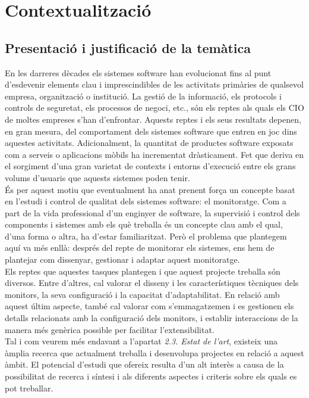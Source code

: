 \chapter{Contextualització}

\label{Contextualitzacio}

\section{Presentació i justificació de la temàtica}

En les darreres dècades els sistemes software han evolucionat fins al punt d’esdevenir elements clau i imprescindibles de les activitats primàries de qualsevol empresa, organització o institució. La gestió de la informació, els protocols i controls de seguretat, els processos de negoci, etc., són els reptes als quals els CIO de moltes empreses s’han d’enfrontar. Aquests reptes i els seus resultats depenen, en gran mesura, del comportament dels sistemes software que entren en joc dins aquestes activitats. Adicionalment, la quantitat de productes software exposats com a serveis o aplicacions mòbils ha incrementat dràsticament. Fet que deriva en el sorgiment d'una gran varietat de contexts i entorns d'execució entre els grans volums d'usuaris que aquests sistemes poden tenir. \\

És per aquest motiu que eventualment ha anat prenent força un concepte basat en l’estudi i control de qualitat dels sistemes software: el monitoratge. Com a part de la vida professional d’un enginyer de software, la supervisió i control dels components i sistemes amb els què treballa és un concepte clau amb el qual, d’una forma o altra, ha d’estar familiaritzat. Però el problema que plantegem aquí va més enllà: després del repte de monitorar els sistemes, ens hem de plantejar com dissenyar, gestionar i adaptar aquest monitoratge.\\

Els reptes que aquestes tasques plantegen i que aquest projecte treballa són diversos. Entre d'altres, cal valorar el disseny i les característiques tècniques dels monitors, la seva configuració i la capacitat d'adaptabilitat. En relació amb aquest últim aspecte, també cal valorar com s'emmagatzemen i es gestionen els detalls relacionats amb la configuració dels monitors, i establir interaccions de la manera més genèrica possible per facilitar l'extensibilitat.\\

Tal i com veurem més endavant a l’apartat \textit{2.3. Estat de l’art}, existeix una àmplia recerca que actualment treballa i desenvolupa projectes en relació a aquest àmbit. El potencial d’estudi que ofereix resulta d’un alt interès a causa de la possibilitat de recerca i síntesi i als diferents aspectes i criteris sobre els quals es pot treballar.\\

